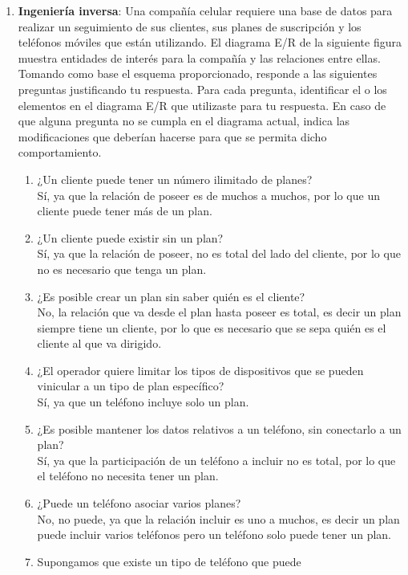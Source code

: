 \documentclass[a4paper, 12pt]{report}
\begin{document}
\begin{enumerate}
		\item \textbf{Ingeniería inversa}:
		Una compañía celular requiere una base de datos para realizar
		un seguimiento de sus clientes, sus planes de suscripción y
		los teléfonos móviles que  están  utilizando.  El diagrama
		E/R de  la  siguiente figura  muestra  entidades  de  interés
		para  la  compañía  y  las  relaciones  entre  ellas.
		Tomando  como base el esquema proporcionado, responde a las
		siguientes preguntas justificando tu respuesta. Para cada
		pregunta, identificar el o los elementos en el diagrama E/R
		que utilizaste para tu respuesta. En caso de que alguna
		pregunta no se cumpla en el diagrama actual, indica las
		modificaciones que deberían hacerse para que se permita dicho
		comportamiento.\\
		\begin{enumerate}
			\item ¿Un cliente puede tener un número ilimitado de planes?\\
			Sí, ya que la relación de poseer es de muchos a muchos, por
			lo que un cliente puede tener más de un plan.
			\item ¿Un cliente puede existir sin un plan?\\
			Sí, ya que la relación de poseer, no es total del lado del
			cliente, por lo que no es necesario que tenga un plan.
			\item ¿Es posible crear un plan sin saber quién es el
			cliente?\\
			No, la relación que va desde el plan hasta poseer es total,
			es decir un plan siempre tiene un cliente, por lo que es
			necesario que se sepa quién es el cliente al que va
			dirigido.
			\item ¿El operador quiere limitar los tipos de dispositivos
			que se pueden vinicular a un tipo de plan específico?\\
			Sí, ya que un teléfono incluye solo un plan.
			\item ¿Es posible mantener los datos relativos a un
			teléfono, sin conectarlo a un plan?\\
			Sí, ya que la participación de un teléfono a incluir no es
			total, por lo que el teléfono no necesita tener un plan.
			\item ¿Puede un teléfono asociar varios planes?\\
			No, no puede, ya que la relación incluir es uno a muchos,
			es decir un plan puede incluir varios teléfonos pero un
			teléfono solo puede tener un plan.
			\item Supongamos que existe un tipo de teléfono que puede

\end{enumerate}
\end{enumerate}
\end{document}
